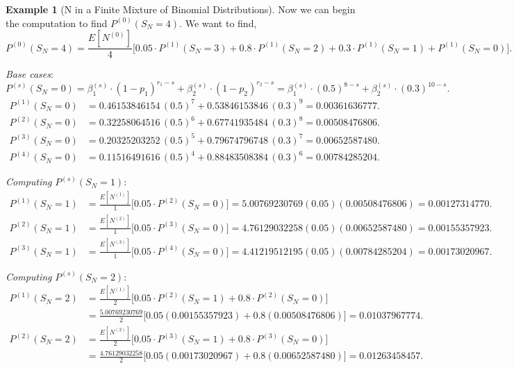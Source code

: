 \documentclass[11pt]{amsart}
\theoremstyle{definition}
\newtheorem{example}{Example}
\theoremstyle{plain}
\begin{document}
\begin{example}[N in a Finite Mixture of Binomial Distributions]
Now we can begin the computation to find $P^{(0)}(S_N = 4)$.  We want to find,
\[
    P^{(0)}(S_N = 4)
    = \frac{E[N^{(0)}]}{4}
      \bigl[0.05 \cdot P^{(1)}(S_N = 3) + 0.8 \cdot P^{(1)}(S_N = 2)
      + 0.3 \cdot P^{(1)}(S_N = 1) + P^{(1)}(S_N = 0)\bigr].
\]

\noindent\textit{Base cases}:
\[
    P^{(s)}(S_N = 0)
    = \beta_1^{(s)} \cdot (1-p_1)^{r_1-s} + \beta_2^{(s)} \cdot (1-p_2)^{r_2-s}
    = \beta_1^{(s)} \cdot (0.5)^{8-s} + \beta_2^{(s)} \cdot (0.3)^{10-s}.
\]
\begin{align*}
P^{(1)}(S_N = 0)
    &= 0.46153846154\,(0.5)^7 + 0.53846153846\,(0.3)^9
     = 0.00361636777. \\
P^{(2)}(S_N = 0)
    &= 0.32258064516\,(0.5)^6 + 0.67741935484\,(0.3)^8
     = 0.00508476806. \\
P^{(3)}(S_N = 0)
    &= 0.20325203252\,(0.5)^5 + 0.79674796748\,(0.3)^7
     = 0.00652587480. \\
P^{(4)}(S_N = 0)
    &= 0.11516491616\,(0.5)^4 + 0.88483508384\,(0.3)^6
     = 0.00784285204.
\end{align*}

\noindent\textit{Computing} $P^{(s)}(S_N = 1)$:
\begin{align*}
P^{(1)}(S_N = 1)
    &= \frac{E[N^{(1)}]}{1}\bigl[0.05 \cdot P^{(2)}(S_N = 0)\bigr]
     = 5.00769230769(0.05)(0.00508476806) = 0.00127314770. \\
P^{(2)}(S_N = 1)
    &= \frac{E[N^{(2)}]}{1}\bigl[0.05 \cdot P^{(3)}(S_N = 0)\bigr]
     = 4.76129032258(0.05)(0.00652587480) = 0.00155357923. \\
P^{(3)}(S_N = 1)
    &= \frac{E[N^{(3)}]}{1}\bigl[0.05 \cdot P^{(4)}(S_N = 0)\bigr]
     = 4.41219512195(0.05)(0.00784285204) = 0.00173020967.
\end{align*}

\noindent\textit{Computing} $P^{(s)}(S_N = 2)$:
\begin{align*}
P^{(1)}(S_N = 2)
    &= \frac{E[N^{(1)}]}{2}
       \bigl[0.05 \cdot P^{(2)}(S_N = 1) + 0.8 \cdot P^{(2)}(S_N = 0)\bigr] \\
    &= \frac{5.00769230769}{2}
       \bigl[0.05(0.00155357923) + 0.8(0.00508476806)\bigr]
     = 0.01037967774. \\
P^{(2)}(S_N = 2)
    &= \frac{E[N^{(2)}]}{2}
       \bigl[0.05 \cdot P^{(3)}(S_N = 1) + 0.8 \cdot P^{(3)}(S_N = 0)\bigr] \\
    &= \frac{4.76129032258}{2}
       \bigl[0.05(0.00173020967) + 0.8(0.00652587480)\bigr]
     = 0.01263458457.
\end{align*}


\end{example}
\end{document}
